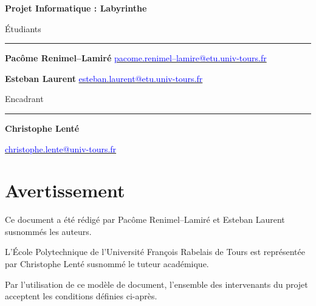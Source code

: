 \documentclass[12pt]{scrreprt} %
\begin{document}
\begin{titlepage}
\begin{center}
        \textbf{Projet Informatique : Labyrinthe}
    \end{center}
    \vfill

    \begin{minipage}[t]{0.5\textwidth}
        \begin{flushleft}
            Étudiants
            \vspace{0.1cm}
            \hrule %
            \vspace{0.5cm}

            \textbf{Pacôme Renimel--Lamiré}
            \href{mailto:pacome.renimel--lamire@etu.univ-tours.fr}{\textcolor{blue}{pacome.renimel--lamire@etu.univ-tours.fr}}

            \textbf{Esteban Laurent}
            \href{mailto:esteban.laurent@etu.univ-tours.fr}{\textcolor{blue}{esteban.laurent@etu.univ-tours.fr}}
        \end{flushleft}
    \end{minipage}
    \begin{minipage}[t]{0.5\textwidth}
        \begin{flushright}
            Encadrant

            \vspace{0.1cm}
            \hrule %
            \vspace{0.5cm}

            \textbf{Christophe Lenté}

            \href{mailto:christophe.lente@univ-tours.fr}{\textcolor{blue}{christophe.lente@univ-tours.fr}}

        \end{flushright}
    \end{minipage}

\end{titlepage}
\restoregeometry


\chapter*{Avertissement}


Ce document a été rédigé par Pacôme Renimel--Lamiré et Esteban Laurent susnommés les auteurs.

L’École Polytechnique de l’Université François Rabelais de Tours est représentée par Christophe Lenté susnommé le tuteur académique.

Par l’utilisation de ce modèle de document, l’ensemble des intervenants du projet acceptent
les conditions définies ci-après.
\end{document}
